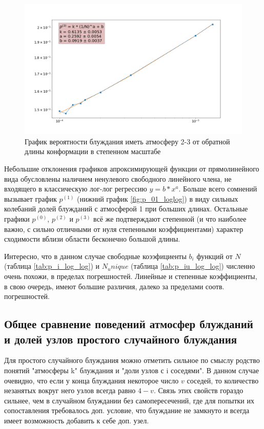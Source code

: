 \begin{figure}[h]
\begin{minipage}{0.49\textwidth}
\includegraphics[width=\textwidth]{Sections/Images_2/p3_res.png}
\caption{График вероятности блуждания иметь атмосферу 2-3 от обратной длины конформации в степенном масштабе}
\label{fig:p_23_loglog}
\end{minipage}
\end{figure}

Небольшие отклонения графиков апроксимирующей функции от прямолинейного вида обусловлены наличием ненулевого свободного линейного члена,
не входящего в классическую лог-лог регрессию $y = b * x^a$.
Больше всего сомнений вызывает график $p^{(1)}$ (нижний график \ref{fig:p_01_loglog}) в виду сильных колебаний долей блужданий с атмосферой 1 при больших длинах.
Остальные графики $p^{(0)}$, $p^{(2)}$ и $p^{(3)}$ всё же подтверждают степенной (и что наиболее важно, с сильно отличными от нуля степенными коэффициентами) характер сходимости вблизи области бесконечно большой длины.

Интересно, что в данном случае свободные коээфициенты $b_i$ функций от $N$ (таблица \ref{tab:p_i_log_log}) и $N_unique$ (таблица \ref{tab:p_iu_log_log}) численно очень похожи, в пределах погрешностей. Линейные и степенные коэффициенты, в свою очередь, имеют большие различия, далеко за пределами соотв. погрешностей.

\subsection{Общее сравнение поведений атмосфер блужданий и долей узлов простого случайного блуждания}

Для простого случайного блуждания можно отметить сильное по смыслу родство понятий "атмосферы k" блуждания и "доли узлов с i соседями". 
В данном случае очевидно, что если у конца блуждания некоторое число $v$ соседей, то количество незанятых вокруг него узлов всегда равно $4-v$. 
Связь этих свойств гораздо сильнее, чем в случайном блуждании без самопересечений, где для попытки их сопоставления требовалось доп. условие, что блуждание не замкнуто и всегда имеет возможность добавить к себе доп. узел.

